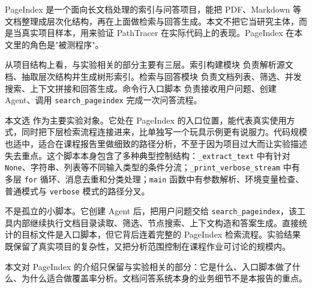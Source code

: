 PageIndex 是一个面向长文档处理的索引与问答项目，能把 PDF、Markdown 等文档整理成层次化结构，再在上面做检索与回答生成。本文不把它当研究主体，而是当真实项目样本，用来验证 PathTracer 在实际代码上的表现。PageIndex 在本文里的角色是"被测程序"。

从项目结构上看，与实验相关的部分主要有三层。索引构建模块  负责解析源文档、抽取层次结构并生成树形索引。检索与回答模块  负责文档列表、筛选、并发搜索、上下文拼接和回答生成。命令行入口脚本  负责接收用户问题、创建 Agent、调用 \texttt{search\_pageindex} 完成一次问答流程。

本文选  作为主要实验对象。它处在 PageIndex 的入口位置，能代表真实使用方式，同时把下层检索流程连接进来，比单独写一个玩具示例更有说服力。代码规模也适中，适合在课程报告里做细致的路径分析，不至于因为项目过大而让实验描述失去重点。这个脚本本身包含了多种典型控制结构：\texttt{\_extract\_text} 中有针对 \texttt{None}、字符串、列表等不同输入类型的条件分流；\texttt{\_print\_verbose\_stream} 中有多层 \texttt{for} 循环、消息去重和分类处理；\texttt{main} 函数中有参数解析、环境变量检查、普通模式与 \texttt{verbose} 模式的路径分叉。

 不是孤立的小脚本。它创建 Agent 后，把用户问题交给 \texttt{search\_pageindex}，该工具内部继续执行文档目录读取、筛选、节点搜索、上下文构造和答案生成。直接统计的目标文件是入口脚本，但它背后连着完整的 PageIndex 检索流程。实验结果既保留了真实项目的复杂性，又把分析范围控制在课程作业可讨论的规模内。

本文对 PageIndex 的介绍只保留与实验相关的部分：它是什么、入口脚本做了什么、为什么适合做覆盖率分析。文档问答系统本身的业务细节不是本报告的重点。
